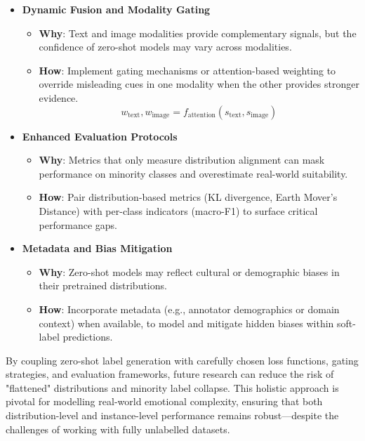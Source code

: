 \begin{itemize}
    \item \textbf{Dynamic Fusion and Modality Gating}
    \begin{itemize}
        \item \textbf{Why}: Text and image modalities provide complementary signals, but the confidence of zero-shot models may vary across modalities.
        \item \textbf{How}: Implement gating mechanisms or attention-based weighting to override misleading cues in one modality when the other provides stronger evidence.
        \begin{equation}
            w_{\text{text}}, w_{\text{image}} = f_{\text{attention}}(s_{\text{text}}, s_{\text{image}})
        \end{equation}
    \end{itemize}
    
    \item \textbf{Enhanced Evaluation Protocols}
    \begin{itemize}
        \item \textbf{Why}: Metrics that only measure distribution alignment can mask performance on minority classes and overestimate real-world suitability.
        \item \textbf{How}: Pair distribution-based metrics (KL divergence, Earth Mover’s Distance) with per-class indicators (macro-F1) to surface critical performance gaps.
    \end{itemize}
    
    \item \textbf{Metadata and Bias Mitigation}
    \begin{itemize}
        \item \textbf{Why}: Zero-shot models may reflect cultural or demographic biases in their pretrained distributions.
        \item \textbf{How}: Incorporate metadata (e.g., annotator demographics or domain context) when available, to model and mitigate hidden biases within soft-label predictions.
    \end{itemize}
\end{itemize}

By coupling zero-shot label generation with carefully chosen loss functions, gating strategies, and evaluation frameworks, future research can reduce the risk of "flattened" distributions and minority label collapse. This holistic approach is pivotal for modelling real-world emotional complexity, ensuring that both distribution-level and instance-level performance remains robust—despite the challenges of working with fully unlabelled datasets.




